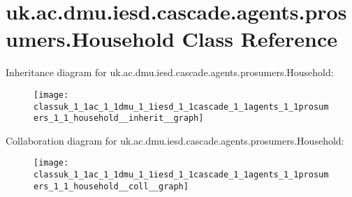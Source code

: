 \hypertarget{classuk_1_1ac_1_1dmu_1_1iesd_1_1cascade_1_1agents_1_1prosumers_1_1_household}{\section{uk.\-ac.\-dmu.\-iesd.\-cascade.\-agents.\-prosumers.\-Household Class Reference}
\label{classuk_1_1ac_1_1dmu_1_1iesd_1_1cascade_1_1agents_1_1prosumers_1_1_household}
}


Inheritance diagram for uk.\-ac.\-dmu.\-iesd.\-cascade.\-agents.\-prosumers.\-Household\-:\nopagebreak
\begin{figure}[H]
\begin{center}
\leavevmode
\texttt{[image: classuk\_1\_1ac\_1\_1dmu\_1\_1iesd\_1\_1cascade\_1\_1agents\_1\_1prosumers\_1\_1\_household\_\_inherit\_\_graph]}
\end{center}
\end{figure}


Collaboration diagram for uk.\-ac.\-dmu.\-iesd.\-cascade.\-agents.\-prosumers.\-Household\-:\nopagebreak
\begin{figure}[H]
\begin{center}
\leavevmode
\texttt{[image: classuk\_1\_1ac\_1\_1dmu\_1\_1iesd\_1\_1cascade\_1\_1agents\_1\_1prosumers\_1\_1\_household\_\_coll\_\_graph]}
\end{center}
\end{figure}
